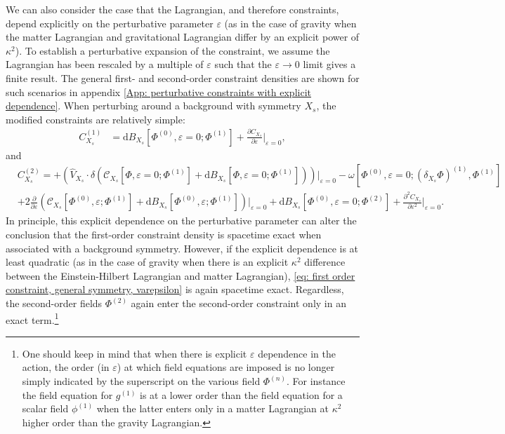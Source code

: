 \documentclass[]{jkpaper}
\theoremstyle{plain}
\theoremstyle{definition}
\newcommand{\fins}{\cdot}
\newcommand{\sd}{\mathrm {d}}
\newcommand{\fd}{\delta}
\begin{document}
We can also consider the case that the Lagrangian, and therefore constraints, depend explicitly on the perturbative parameter $\varepsilon$ (as in the case of gravity when the matter Lagrangian and gravitational Lagrangian differ by an explicit power of $\kappa^2$). To establish a perturbative expansion of the constraint, we assume the Lagrangian has been rescaled by a multiple of $\varepsilon$ such that the $\varepsilon\rightarrow 0$ limit gives a finite result.  The general first- and second-order constraint densities are shown for such scenarios in appendix \ref{App: perturbative constraints with explicit dependence}.  When perturbing around a background with symmetry $X_s$, the modified constraints are relatively simple:
\begin{align}
\label{eq: first order constraint, general symmetry, varepsilon}
     C_{X_s}^{(1)}&=
     \sd B_{X_s}\left[\Phi^{(0)},\varepsilon=0; \Phi^{(1)}\right]
     +\frac{\partial C_{X_s}}{\partial\varepsilon}\bigg|_{\varepsilon=0},
\end{align}
and
\begin{equation}\begin{split}
\label{eq: second order constraint, general symmetry, varepsilon}
     &C_{X_s}^{(2)}=
     +\left(\hat{V}_{X_s}\fins\fd
     \left(\mathcal{C}_{X_s}\left[\Phi,\varepsilon=0;\Phi^{(1)}\right]
      +\sd B_{X_s}\left[\Phi,\varepsilon=0;\Phi^{(1)}\right]\right)\right)\big|_{\varepsilon=0}
      -\omega\left[\Phi^{(0)},\varepsilon=0;(\delta_{X_s}\Phi)^{(1)},\Phi^{(1)}\right]\\
      &+2\frac{\partial}{\partial\varepsilon}\left(\mathcal{C}_{X_s}\left[\Phi^{(0)},\varepsilon;\Phi^{(1)}\right]+\sd B_{X_s}\left[\Phi^{(0)},\varepsilon;\Phi^{(1)}\right]\right)\big|_{\varepsilon=0}
       +\sd B_{X_s}\left[\Phi^{(0)},\varepsilon=0;\Phi^{(2)}\right]
       +\frac{\partial^2 C_{X_s}}{\partial\varepsilon^2}\bigg|_{\varepsilon=0}.
\end{split}\end{equation}
In principle, this explicit dependence on the perturbative parameter can alter the conclusion that the first-order constraint density is spacetime exact when associated with a background symmetry.  However, if the explicit dependence is at least quadratic (as in the case of gravity when there is an explicit $\kappa^2$ difference between the Einstein-Hilbert Lagrangian and matter Lagrangian), \eqref{eq: first order constraint, general symmetry, varepsilon} is again spacetime exact.  Regardless, the second-order fields $\Phi^{(2)}$ again enter the second-order constraint only in an exact term.\footnote{One should keep in mind that when there is explicit $\varepsilon$ dependence in the action, the order (in $\varepsilon$) at which field equations are imposed is no longer simply indicated by the superscript on the various field $\Phi^{(n)}$.  For instance the field equation for $g^{(1)}$ is at a lower order than the field equation for a scalar field $\phi^{(1)}$ when the latter enters only in a matter Lagrangian at $\kappa^2$ higher order than the gravity Lagrangian.}
\end{document}

